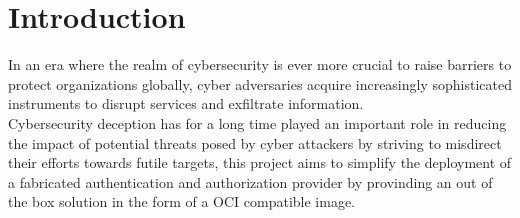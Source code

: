 \section{Introduction}

In an era where the realm of cybersecurity is ever more crucial to raise barriers to protect organizations globally, cyber adversaries acquire increasingly sophisticated instruments to disrupt services and exfiltrate information.\\
Cybersecurity deception has for a long time played an important role in reducing the impact of potential threats posed by cyber attackers by striving to misdirect their efforts towards futile targets, this project aims to simplify the deployment of a fabricated authentication and authorization provider by provinding an out of the box solution in the form of a OCI compatible image.

